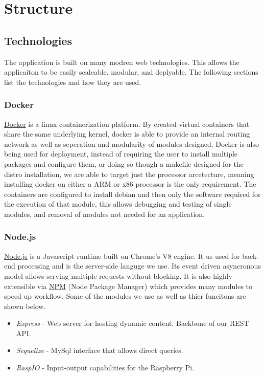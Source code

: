 \section{Structure}



\subsection{Technologies}

The application is built on many modren web technologies. This allows the applicaiton to be easily scaleable, modular, and deplyable. The following sections list the technologies and how they are used.

\subsubsection{Docker}
\href{https://www.docker.com/}{Docker} is a linux containerization platform. By created virtual containers that share the same underlying kernel, docker is able to provide an internal routing network as well as seperation and modularity of modules designed. Docker is also being used for deployment, instead of requiring the user to install multiple packages and configure them, or doing so though a makefile designed for the distro installation, we are able to target just the processor arcetecture, meaning installing docker on either a ARM or x86 processor is the only requirement. The containers are configured to install debian and then only the software required for the execution of that module, this allows debugging and testing of single modules, and removal of modules not needed for an application.

\subsubsection{Node.js}
\href{https://nodejs.org/en/}{Node.js} is a Javascript runtime built on Chrome's V8 engine. It us used for back-end processing and is the server-side languge we use. Its event driven asyncronous model allows serving multiple requests without blocking. It is also highly extensible via \href{https://www.npmjs.com/}{NPM} (Node Package Manager) which provides many modules to speed up workflow. Some of the modules we use as well as thier funcitons are shown below.

\begin{itemize}
  \item \emph{Express} - Web server for hosting dynamic content. Backbone of our REST API.
  \item \emph{Sequelize} - MySql interface that allows direct queries.
  \item \emph{RaspIO} - Input-output capabilities for the Raspberry Pi.
\end{itemize}

